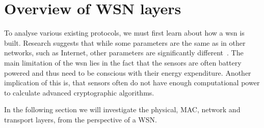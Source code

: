 \section{Overview of WSN layers}  \label{sec:layers}

To analyse various existing protocols, we must first learn about how a \acrlong{wsn} is built. Research suggests that while some parameters are the same as in other networks, such as Internet, other parameters are significantly different~\cite{Sohrabi2000ProtocolsNetwork}. The main limitation of the \acrshort{wsn} lies in the fact that the sensors are often battery powered and thus need to be conscious with their energy expenditure. Another implication of this is, that sensors often do not have enough computational power to calculate advanced cryptographic algorithms.

In the following section we will investigate the physical, MAC, network and transport layers, from the perspective of a WSN.